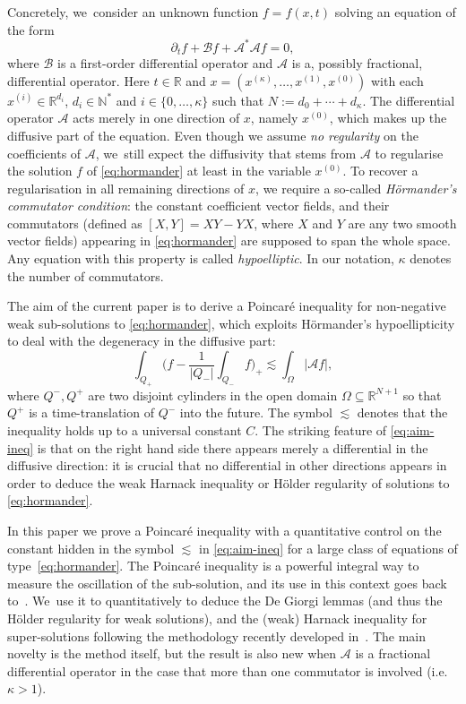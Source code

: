 \documentclass[10pt,a4paper]{amsart}
\providecommand{\ie}{i.e.}
\theoremstyle{definition}
\newcommand\N{{\mathbb N}}
\newcommand\R{{\mathbb R}}
\newcommand{\cA}{{\mathcal A}}
\newcommand{\cB}{{\mathcal B}}
\begin{document}
Concretely, we~consider an unknown function $f=f(x,t)$ solving an equation of the form
\begin{equation}
\label{eq:hormander}
\partial_t f + \cB f + \cA^* \cA f =0,
\end{equation}
where $\cB$ is a first-order differential operator and
$\cA$ is a, possibly fractional, differential operator.
Here $t \in \R$ and $x=(x^{(\kappa)},\dots,x^{(1)},x^{(0)})$
with each
$x^{(i)} \in \R^{d_i}$, $d_i \in \N^*$ and
$i \in \{0,\dots,\kappa\}$ such that
$N:=d_0+\cdots+d_\kappa$. The differential operator $\cA$ acts merely in one direction of $x$, namely $x^{(0)}$,
which makes up the diffusive part of the equation.
Even though we assume \textit{no regularity} on the coefficients of $\cA$, we~still expect the diffusivity that stems from $\cA$ to regularise the
solution $f$ of \eqref{eq:hormander} at least in the variable $x^{(0)}$. To recover a regularisation in all remaining directions of $x$,
we require a so-called \textit{Hörmander's commutator condition}: the constant coefficient vector fields, and their commutators
(defined as $[X, Y] = XY - YX$, where $X$ and $Y$ are any two smooth vector fields) appearing in \eqref{eq:hormander} are supposed
to span the whole space. Any equation with this property is called \textit{hypoelliptic}. In our notation, $\kappa$ denotes the number of commutators.

The aim of the current paper is to derive a Poincaré inequality for non-negative weak sub-solutions to \eqref{eq:hormander},
which exploits Hörmander's hypoellipticity to deal with the degeneracy in the diffusive part:
\begin{equation}\label{eq:aim-ineq}
\int_{Q_+} \biggl(f - \frac{1}{|Q_-|} \int_{Q_-} f
\biggr)_+ \lesssim \int_\Omega |\cA f|,
\end{equation}
where $Q^-,Q^+$ are two disjoint cylinders in the open domain
$\Omega \subseteq \mathbb{R}^{N+1}$ so that $Q^+$ is a time-translation of $Q^-$ into the
future. The symbol $\lesssim$ denotes that the inequality holds up to a universal constant $C$.
The striking feature of \eqref{eq:aim-ineq} is that on the right hand side there appears merely a differential in the diffusive direction: it is crucial that no differential in other directions appears in order to deduce the weak Harnack inequality or Hölder regularity of solutions to \eqref{eq:hormander}.

In this paper we prove a Poincaré inequality with a
quantitative control on the constant hidden in the symbol $\lesssim$ in \eqref{eq:aim-ineq} for a large class of
equations of type~\eqref{eq:hormander}.
The Poincaré inequality is a
powerful integral way to measure the oscillation of the
sub-solution, and its use in this context goes back
to~\cite{nash,moser}. We~use it to quantitatively to deduce the De Giorgi
lemmas (and thus the Hölder regularity for weak solutions), and the (weak)
Harnack inequality for super-solutions following the methodology
recently developed
in~\cite{guerand-mouhot,loher-2022-preprint-quantitative-de-giorgi}. The main novelty is
the method itself, but the result is
also new when $\mathcal A$ is a fractional differential operator in the case that more than one commutator is
involved (\ie $\kappa > 1$).
\end{document}
